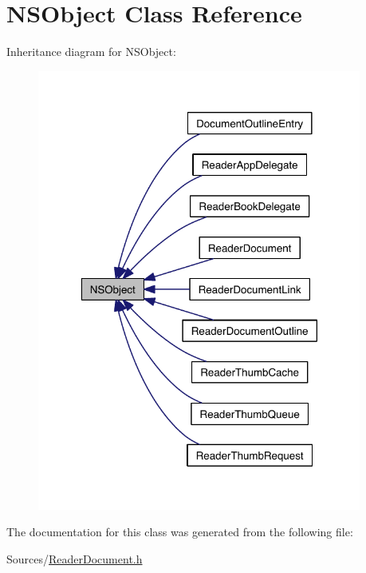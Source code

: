 \hypertarget{class_n_s_object}{\section{N\-S\-Object Class Reference}
\label{d7/dc4/class_n_s_object}
}


Inheritance diagram for N\-S\-Object\-:
\nopagebreak
\begin{figure}[H]
\begin{center}
\leavevmode
\includegraphics[width=302pt]{db/dd8/class_n_s_object__inherit__graph}
\end{center}
\end{figure}


The documentation for this class was generated from the following file\-:\begin{DoxyCompactItemize}
\item 
Sources/\hyperlink{_reader_document_8h}{Reader\-Document.\-h}\end{DoxyCompactItemize}
